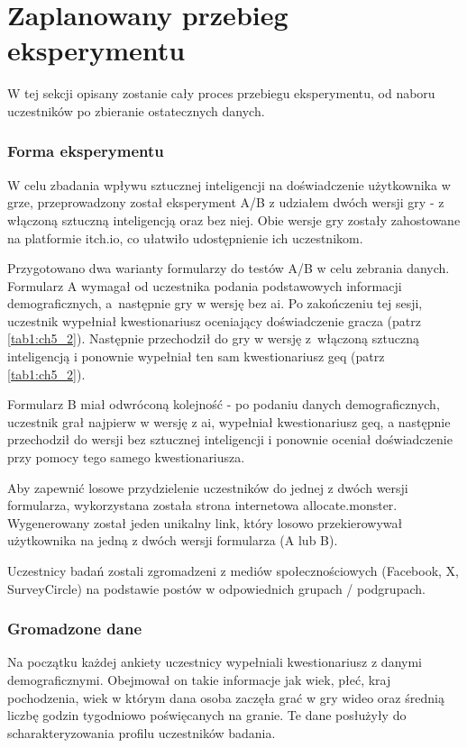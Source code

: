 \section{Zaplanowany przebieg eksperymentu}\label{section:ch6_3}

W tej sekcji opisany zostanie cały proces przebiegu eksperymentu, od naboru uczestników po
zbieranie ostatecznych danych.

\subsubsection*{Forma eksperymentu}

W celu zbadania wpływu sztucznej inteligencji na doświadczenie użytkownika w grze, przeprowadzony
został eksperyment A/B z udziałem dwóch wersji gry - z włączoną sztuczną inteligencją oraz bez niej.
Obie wersje gry zostały zahostowane na platformie itch.io, co ułatwiło udostępnienie ich uczestnikom.

Przygotowano dwa warianty formularzy do testów A/B w celu zebrania danych. Formularz A wymagał od
uczestnika podania podstawowych informacji demograficznych, a~następnie gry w wersję bez \gls{ai}. Po
zakończeniu tej sesji, uczestnik wypełniał kwestionariusz oceniający doświadczenie gracza (patrz \ref{tab1:ch5_2}).
Następnie przechodził do gry w wersję z~włączoną sztuczną inteligencją i ponownie wypełniał ten
sam kwestionariusz \gls{geq} (patrz \ref{tab1:ch5_2}).

Formularz B miał odwróconą kolejność - po podaniu danych demograficznych, uczestnik grał najpierw
w wersję z \gls{ai}, wypełniał kwestionariusz \gls{geq}, a następnie przechodził do wersji bez sztucznej
inteligencji i ponownie oceniał doświadczenie przy pomocy tego samego kwestionariusza.

Aby zapewnić losowe przydzielenie uczestników do jednej z dwóch wersji formularza, wykorzystana
została strona internetowa allocate.monster. Wygenerowany został jeden unikalny link, który losowo
przekierowywał użytkownika na jedną z dwóch wersji formularza (A lub B).

Uczestnicy badań zostali zgromadzeni z mediów społecznościowych (Facebook, X, SurveyCircle) na podstawie
postów w odpowiednich grupach / podgrupach.

\subsubsection*{Gromadzone dane}

Na początku każdej ankiety uczestnicy wypełniali kwestionariusz z danymi demograficznymi. Obejmował
on takie informacje jak wiek, płeć, kraj pochodzenia, wiek w którym dana osoba zaczęła grać w gry
wideo oraz średnią liczbę godzin tygodniowo poświęcanych na granie. Te dane posłużyły do
scharakteryzowania profilu uczestników badania.

